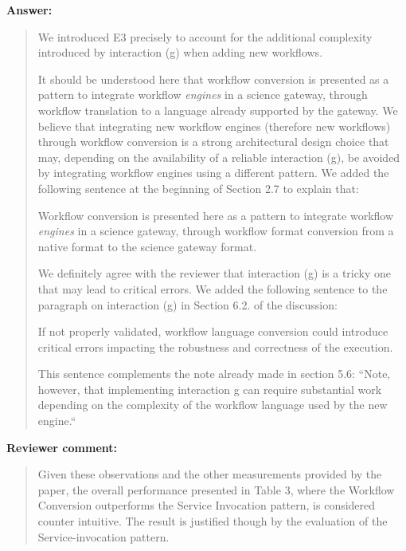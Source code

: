 \documentclass[a4]{article}
\newenvironment{review}%
{\textbf{Reviewer comment:}\begin{quote}}%
{\end{quote}}%
\newenvironment{answer}%
{\textbf{Answer:}\begin{small}\begin{quote}}%
{\end{quote}\end{small}}%
\newcommand{\revised}[1]{\color{blue} #1\color{black}\xspace}
\begin{document}
\begin{answer}
  We introduced E3 precisely to account for the additional
  complexity introduced by interaction (g) when adding new
  workflows. 
  
  It should be understood here that workflow conversion is
  presented as a pattern to integrate workflow \emph{engines} in a
  science gateway, through workflow translation to a language already
  supported by the gateway. We believe that integrating new workflow
  engines (therefore new workflows) through workflow conversion is a
  strong architectural design choice that may, depending on the
  availability of a reliable interaction (g), be avoided by
  integrating workflow engines using a different pattern. We added the following sentence at the beginning of Section 2.7 to explain that:
  
  \revised{Workflow conversion is presented here as a pattern to
integrate workflow \emph{engines} in a science gateway, through
workflow format conversion from a native format to the science gateway
format.}


We definitely agree with the reviewer that interaction (g) is
  a tricky one that may lead to critical errors. We added the
  following sentence to the paragraph on interaction (g) in Section
  6.2. of the discussion:

\revised{If not properly validated, workflow language conversion
  could introduce critical errors impacting the robustness and
  correctness of the execution. }

This sentence complements the note already made in section 5.6:
``Note, however, that implementing interaction g can require
substantial work depending on the complexity of the workflow language
used by the new engine.``
\end{answer}

\begin{review}
 Given these observations and the other measurements provided by the paper, the overall performance presented in Table 3, where the Workflow Conversion outperforms the Service Invocation pattern, is considered counter intuitive. The result is justified though by the evaluation of the Service-invocation pattern.
\end{review}
\end{document}

